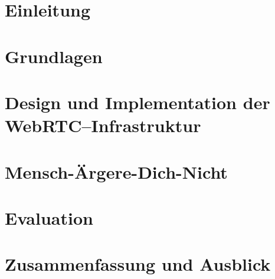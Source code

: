 \documentclass[oneside,11pt,a4paper,bibliography=totocnumbered,numbers=noenddot]{scrreprt}
\begin{document}
\begin{singlespace}
\chapter{Einleitung}


\chapter{Grundlagen}


\chapter{Design und Implementation der WebRTC--Infrastruktur}


\chapter{Mensch-Ärgere-Dich-Nicht}


\chapter{Evaluation}
%
\chapter{Zusammenfassung und Ausblick}
%

%


\clearpage


\end{singlespace}
\end{document}
